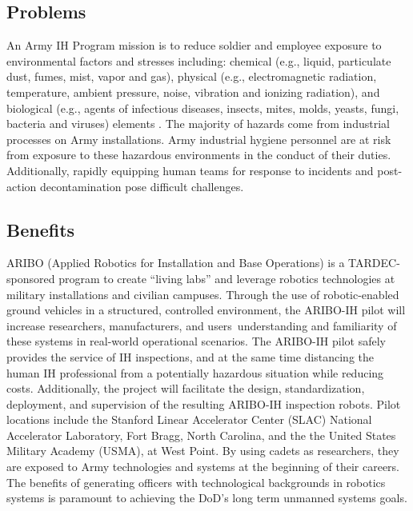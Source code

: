 \subsection{Problems}

An Army IH Program mission is to reduce soldier and employee exposure to environmental factors and stresses including:  chemical (e.g., liquid, particulate dust, fumes, mist, vapor and gas), physical (e.g., electromagnetic radiation, temperature, ambient pressure, noise, vibration and ionizing radiation), and biological (e.g., agents of infectious diseases, insects, mites, molds, yeasts, fungi, bacteria and viruses) elements \cite{ArmymedPAM40503}. The majority of hazards come from industrial processes on Army installations. Army industrial hygiene personnel are at risk from exposure to these hazardous environments in the conduct of their duties. Additionally, rapidly equipping human teams for response to incidents and post-action decontamination pose difficult challenges.  


\subsection{Benefits}

ARIBO (Applied Robotics for Installation and Base Operations) is a TARDEC-sponsored program to create ``living labs'' and leverage robotics technologies at military installations and civilian campuses. Through the use of robotic-enabled ground vehicles in a structured, controlled environment, the ARIBO-IH pilot will increase researchers\textquotesingle, manufacturers\textquotesingle, and users\textquotesingle \ understanding and familiarity of these systems in real-world operational scenarios. The ARIBO-IH pilot safely provides the service of IH inspections, and at the same time distancing the human IH professional from a potentially hazardous situation while reducing costs. Additionally, the project will facilitate the design, standardization, deployment, and supervision of the resulting ARIBO-IH inspection robots. Pilot locations include the Stanford Linear Accelerator Center (SLAC) National Accelerator Laboratory, Fort Bragg, North Carolina, and the the United States Military Academy (USMA), at West Point. By using cadets as researchers, they are exposed to Army technologies and systems at the beginning of their careers. The benefits of generating officers with technological backgrounds in robotics systems is paramount to achieving the DoD’s long term unmanned systems goals.

